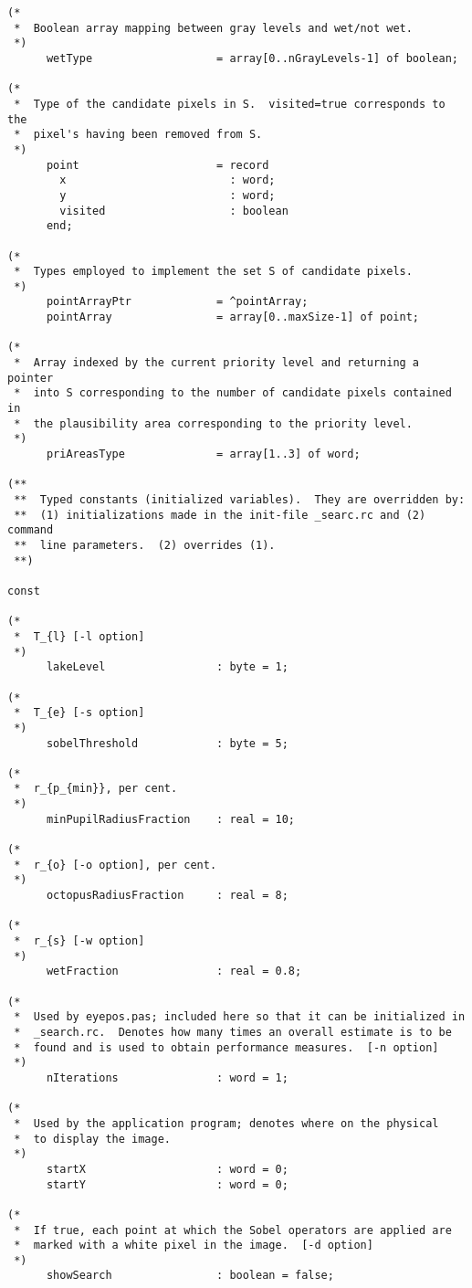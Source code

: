 \begin{verbatim}
(*
 *  Boolean array mapping between gray levels and wet/not wet.
 *)
      wetType                   = array[0..nGrayLevels-1] of boolean;

(*
 *  Type of the candidate pixels in S.  visited=true corresponds to the
 *  pixel's having been removed from S.
 *)
      point                     = record
        x                         : word;
        y                         : word;
        visited                   : boolean
      end;

(*
 *  Types employed to implement the set S of candidate pixels.
 *)
      pointArrayPtr             = ^pointArray;
      pointArray                = array[0..maxSize-1] of point;

(*
 *  Array indexed by the current priority level and returning a pointer
 *  into S corresponding to the number of candidate pixels contained in
 *  the plausibility area corresponding to the priority level.
 *)
      priAreasType              = array[1..3] of word;

(**
 **  Typed constants (initialized variables).  They are overridden by:
 **  (1) initializations made in the init-file _searc.rc and (2) command
 **  line parameters.  (2) overrides (1).
 **)

const

(*
 *  T_{l} [-l option]
 *)
      lakeLevel                 : byte = 1;

(*
 *  T_{e} [-s option]
 *)
      sobelThreshold            : byte = 5;

(*
 *  r_{p_{min}}, per cent.
 *)
      minPupilRadiusFraction    : real = 10;

(*
 *  r_{o} [-o option], per cent.
 *)
      octopusRadiusFraction     : real = 8;

(*
 *  r_{s} [-w option]
 *)
      wetFraction               : real = 0.8;

(*
 *  Used by eyepos.pas; included here so that it can be initialized in
 *  _search.rc.  Denotes how many times an overall estimate is to be
 *  found and is used to obtain performance measures.  [-n option]
 *)
      nIterations               : word = 1;

(*
 *  Used by the application program; denotes where on the physical
 *  to display the image.
 *)
      startX                    : word = 0;
      startY                    : word = 0;

(*
 *  If true, each point at which the Sobel operators are applied are
 *  marked with a white pixel in the image.  [-d option]
 *)
      showSearch                : boolean = false;


\end{verbatim}
